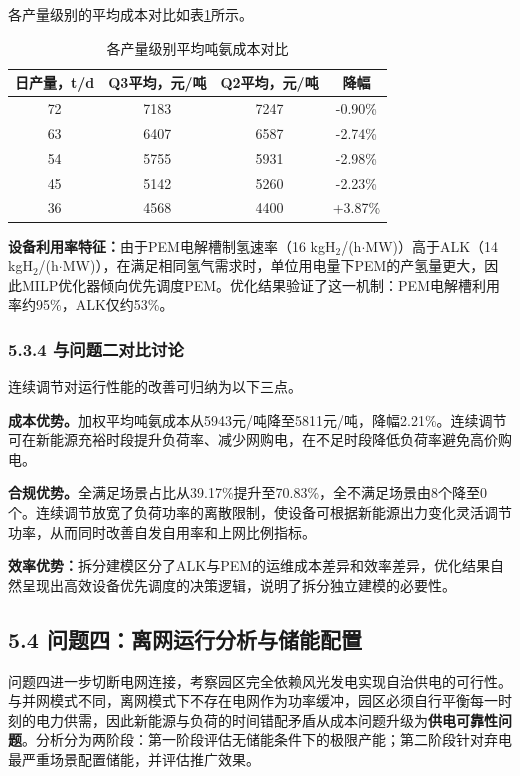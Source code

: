 \documentclass[zihao=-4,a4paper]{ctexart} %
\begin{document}
	各产量级别的平均成本对比如表\ref{tab:q3_levels}所示。
	
	\begin{table}[ht]
		\centering
		\caption{各产量级别平均吨氨成本对比}
		\label{tab:q3_levels}
		\begin{tabular}{cccc}
			\toprule
			日产量，t/d & Q3平均，元/吨 & Q2平均，元/吨 & 降幅 \\
			\midrule
			72 & 7183 & 7247 & -0.90\% \\
			63 & 6407 & 6587 & -2.74\% \\
			54 & 5755 & 5931 & -2.98\% \\
			45 & 5142 & 5260 & -2.23\% \\
			36 & 4568 & 4400 & +3.87\% \\
			\bottomrule
		\end{tabular}
	\end{table}
	
	\textbf{设备利用率特征：}由于PEM电解槽制氢速率（16 kgH$_2$/(h$\cdot$MW)）高于ALK（14 kgH$_2$/(h$\cdot$MW)），在满足相同氢气需求时，单位用电量下PEM的产氢量更大，因此MILP优化器倾向优先调度PEM。优化结果验证了这一机制：PEM电解槽利用率约95\%，ALK仅约53\%。
	
	\subsubsection*{5.3.4 与问题二对比讨论}
	
	连续调节对运行性能的改善可归纳为以下三点。
	
	\textbf{成本优势。}加权平均吨氨成本从5943元/吨降至5811元/吨，降幅2.21\%。连续调节可在新能源充裕时段提升负荷率、减少网购电，在不足时段降低负荷率避免高价购电。
	
	\textbf{合规优势。}全满足场景占比从39.17\%提升至70.83\%，全不满足场景由8个降至0个。连续调节放宽了负荷功率的离散限制，使设备可根据新能源出力变化灵活调节功率，从而同时改善自发自用率和上网比例指标。
	
	\textbf{效率优势：}拆分建模区分了ALK与PEM的运维成本差异和效率差异，优化结果自然呈现出高效设备优先调度的决策逻辑，说明了拆分独立建模的必要性。
	
	\subsection*{5.4 问题四：离网运行分析与储能配置}

问题四进一步切断电网连接，考察园区完全依赖风光发电实现自治供电的可行性。与并网模式不同，离网模式下不存在电网作为功率缓冲，园区必须自行平衡每一时刻的电力供需，因此新能源与负荷的时间错配矛盾从成本问题升级为\textbf{供电可靠性问题}。分析分为两阶段：第一阶段评估无储能条件下的极限产能；第二阶段针对弃电最严重场景配置储能，并评估推广效果。
\end{document}
